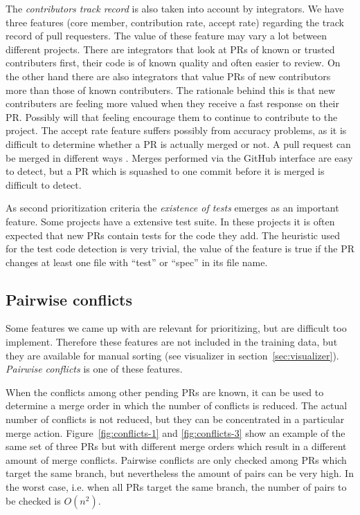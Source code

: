 The \emph{contributors track record} is also taken into account by integrators.
We have three features (core member, contribution rate, accept rate) regarding the track record of pull requesters.
The value of these feature may vary a lot between different projects.
There are integrators that look at PRs of known or trusted contributers first, their code is of known quality and often easier to review.
On the other hand there are also integrators that value PRs of new contributors more than those of known contributers.
The rationale behind this is that new contributers are feeling more valued when they receive a fast response on their PR.
Possibly will that feeling encourage them to continue to contribute to the project.
The accept rate feature suffers possibly from accuracy problems, as it is difficult to determine whether a PR is actually merged or not.
A pull request can be merged in different ways \cite{GPD14}.
Merges performed via the GitHub interface are easy to detect, but a PR which is squashed to one commit before it is merged is difficult to detect.

As second prioritization criteria the \emph{existence of tests} emerges as an important feature.
Some projects have a extensive test suite.
In these projects it is often expected that new PRs contain tests for the code they add.
The heuristic used for the test code detection is very trivial, the value of the feature is true if the PR changes at least one file with ``test'' or ``spec'' in its file name.

\subsection{Pairwise conflicts}
\label{sec:pairwise}

Some features we came up with are relevant for prioritizing, but are difficult too implement.
Therefore these features are not included in the training data, but they are available for manual sorting (see visualizer in section~\ref{sec:visualizer}).
\emph{Pairwise conflicts} is one of these features.

When the conflicts among other pending PRs are known, it can be used to determine a merge order in which the number of conflicts is reduced.
The actual number of conflicts is not reduced, but they can be concentrated in a particular merge action.
Figure~\ref{fig:conflicts-1} and \ref{fig:conflicts-3} show an example of the same set of three PRs but with different merge orders which result in a different amount of merge conflicts.
Pairwise conflicts are only checked among PRs which target the same branch, but nevertheless the amount of pairs can be very high.
In the worst case, i.e. when all PRs target the same branch, the number of pairs to be checked is $O(n^2)$.

